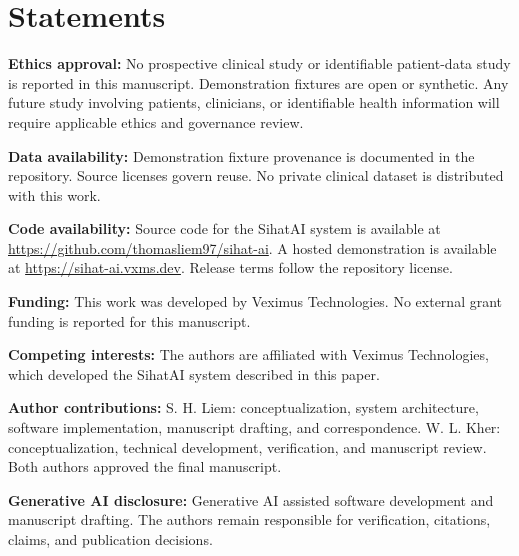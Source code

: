 \documentclass[conference]{IEEEtran}
\begin{document}
\section{Statements}

\textbf{Ethics approval:} No prospective clinical study or identifiable patient-data study is reported in this manuscript. Demonstration fixtures are open or synthetic. Any future study involving patients, clinicians, or identifiable health information will require applicable ethics and governance review.

\textbf{Data availability:} Demonstration fixture provenance is documented in the repository. Source licenses govern reuse. No private clinical dataset is distributed with this work.

\textbf{Code availability:} Source code for the SihatAI system is available at \url{https://github.com/thomasliem97/sihat-ai}. A hosted demonstration is available at \url{https://sihat-ai.vxms.dev}. Release terms follow the repository license.

\textbf{Funding:} This work was developed by Veximus Technologies. No external grant funding is reported for this manuscript.

\textbf{Competing interests:} The authors are affiliated with Veximus Technologies, which developed the SihatAI system described in this paper.

\textbf{Author contributions:} S. H. Liem: conceptualization, system architecture, software implementation, manuscript drafting, and correspondence. W. L. Kher: conceptualization, technical development, verification, and manuscript review. Both authors approved the final manuscript.

\textbf{Generative AI disclosure:} Generative AI assisted software development and manuscript drafting. The authors remain responsible for verification, citations, claims, and publication decisions.



\end{document}
